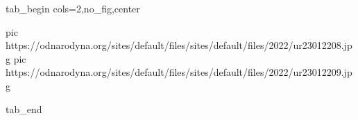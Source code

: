  
 
 
 
 


\ifcmt
  tab_begin cols=2,no_fig,center

     pic https://odnarodyna.org/sites/default/files/sites/default/files/2022/ur23012208.jpg
		 pic https://odnarodyna.org/sites/default/files/sites/default/files/2022/ur23012209.jpg

  tab_end
\fi
